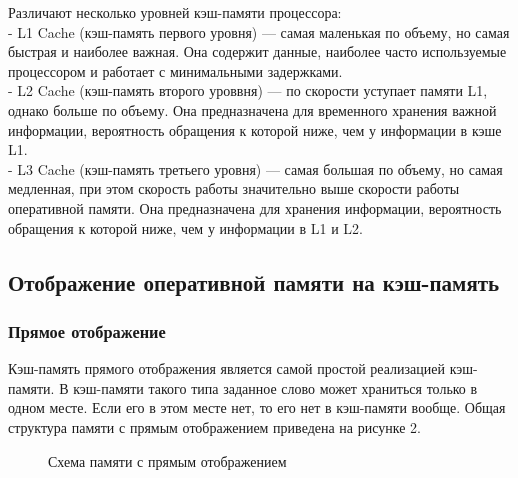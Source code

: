 \documentclass[13pt]{article}
\begin{document}
	Различают несколько уровней кэш-памяти процессора:\\
	- L1 Cache (кэш-память первого уровня) --- самая маленькая по объему, но самая быстрая и наиболее важная. Она содержит данные, наиболее часто используемые процессором и работает с минимальными задержками.\\
	- L2 Cache (кэш-память второго уроввня) --- по скорости уступает памяти L1, однако больше по объему. Она предназначена для временного хранения важной информации, вероятность обращения к которой ниже, чем у информации в кэше L1.\\
	- L3 Cache (кэш-память третьего уровня) --- самая большая по объему, но самая медленная, при этом скорость работы значительно выше скорости работы оперативной памяти. Она предназначена для хранения информации, вероятность обращения к которой ниже, чем у информации в L1 и L2. \cite{book:33862}\\
	\subsection{Отображение оперативной памяти на кэш-память}
	\subsubsection{Прямое отображение}
	
	Кэш-память прямого отображения является самой простой реализацией кэш-памяти. В кэш-памяти такого типа заданное слово может храниться только в одном месте. Если его в этом месте нет, то его нет в кэш-памяти вообще. Общая структура памяти с прямым отображением приведена на рисунке 2.
	\begin{figure}[h!]
		\caption{Схема памяти с прямым отображением}
	\end{figure}
	
\end{document}
